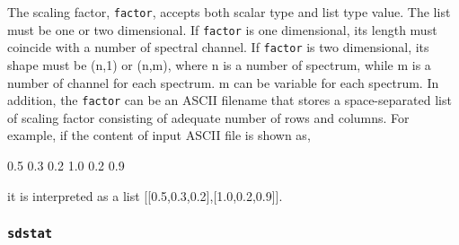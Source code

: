     The scaling factor, {\tt factor}, accepts both scalar type and list type
    value. The list must be one or two dimensional. If {\tt factor} is one
    dimensional, its length must coincide with a number of spectral
    channel. If {\tt factor} is two dimensional, its shape must be (n,1) or
    (n,m), where n is a number of spectrum, while m is a number of channel
    for each spectrum. m can be variable for each spectrum. In addition,
    the {\tt factor} can be an ASCII filename that stores a space-separated list
    of scaling factor consisting of adequate number of rows and columns.
    For example, if the content of input ASCII file is shown as,

      0.5 0.3 0.2
      1.0 0.2 0.9

     it is interpreted as a list [[0.5,0.3,0.2],[1.0,0.2,0.9]].


\subsubsection{{\tt sdstat}}
\label{section:sd.sdtasks.tasks.sdstat}

